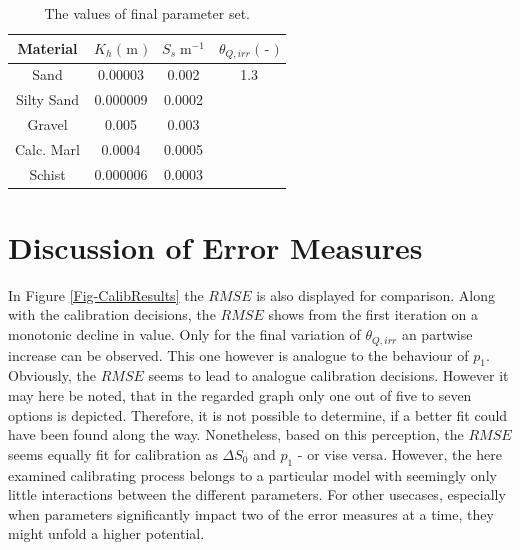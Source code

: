 \begin{table}[h]
    \label{Tab-FinalParams}
    \caption{The values of final parameter set.}
    \begin{tabular}{cccc}
    Material   & $K_h \; \textrm{( m )}$ & $S_s \; \textrm{m}^{-1}$    & $\theta_{Q,irr} \; \textrm{( - )}$ \\ \hline
    Sand       & 0.00003                 & \multicolumn{1}{c|}{0.002}  & 1.3                                \\
    Silty Sand & 0.000009                & \multicolumn{1}{c|}{0.0002} &                                    \\
    Gravel     & 0.005                   & \multicolumn{1}{c|}{0.003}  &                                    \\
    Calc. Marl & 0.0004                  & \multicolumn{1}{c|}{0.0005} &                                    \\
    Schist     & 0.000006                & \multicolumn{1}{c|}{0.0003} &                                   
    \end{tabular}
    \end{table}


\section{Discussion of Error Measures}
\label{Sec-DisEM}

In Figure \ref{Fig-CalibResults} the $RMSE$ is also displayed for comparison. Along with the calibration decisions, the $RMSE$ shows from the first iteration on a monotonic decline in value. Only for the final variation of $\theta_{Q,irr}$ an partwise increase can be observed. This one however is analogue to the behaviour of $p_1$. Obviously, the $RMSE$ seems to lead to analogue calibration decisions. However it may here be noted, that in the regarded graph only one out of five to seven options is depicted. Therefore, it is not possible to determine, if a better fit could have been found along the way. Nonetheless, based on this perception, the $RMSE$ seems equally fit for calibration as $\Delta S_0$ and $p_1$ - or vise versa. However, the here examined calibrating process belongs to a particular model with seemingly only little interactions between the different parameters. For other usecases, especially when parameters significantly impact two of the error measures at a time, they might unfold a higher potential.

